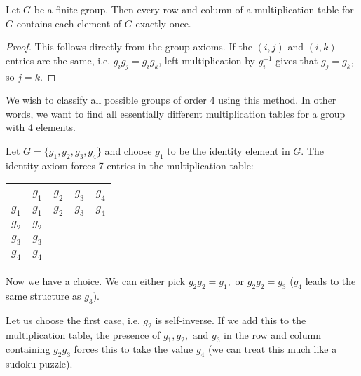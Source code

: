 \begin{theorem}
    Let $G$ be a finite group. Then every row and column of a multiplication table for $G$ contains each element of $G$ exactly once.
\end{theorem}

\begin{proof}
    

    This follows directly from the group axioms. If the $(i,j)$ and $(i,k)$ entries are the same, i.e. $g_ig_j = g_ig_k$, left multiplication by $g_i^{-1}$ gives that $g_j = g_k,$ so $j = k.$
\end{proof}


    We wish to classify all possible groups of order 4 using this method. In other words, we want to find all essentially different multiplication tables for a group with 4 elements.

    Let $G = \{g_1, g_2, g_3, g_4\}$ and choose $g_1$ to be the identity element in $G$. The identity axiom forces 7 entries in the multiplication table:

    \begin{center}
        \begin{tabular}{c| *{4}{c}}
        \multicolumn{5}{c}{} \\
        $\text{ }$ & $g_1$ & $g_2$ & $g_3$ & $g_4$ \\
        \hline
        $g_1$ &  $g_1$ & $g_2$ & $g_3$ & $g_4$ \\
        $g_2$ & $g_2$ & \text{ } & \text{ } & \text{ } \\
        $g_3$ & $g_3$ & \text{ } & \text{ } & \text{ } \\
        $g_4$ & $g_4$ & \text{ } & \text{ } & \text{ }
        \end{tabular}
    \end{center}

    Now we have a choice. We can either pick $g_2g_2 = g_1,$ or $g_2g_2 = g_3$ ($g_4$ leads to the same structure as $g_3$). 
    
    Let us choose the first case, i.e. $g_2$ is self-inverse. If we add this to the multiplication table, the presence of $g_1,g_2, \text{ and } g_3$ in the row and column containing $g_2g_3$ forces this to take the value $g_4$ (we can treat this much like a sudoku puzzle). 
    
